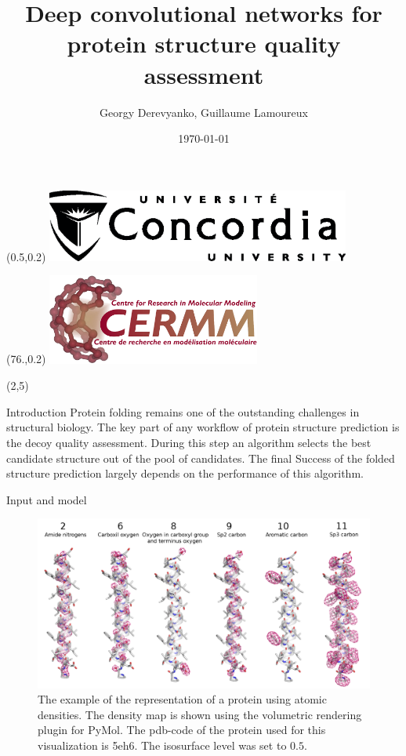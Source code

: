 \documentclass[final, unknownkeysallowed]{beamer}
\title{Deep convolutional networks for protein structure quality assessment}
\author{Georgy Derevyanko, Guillaume Lamoureux}
\institute[CLS]{Concordia University, QC, Canada}
\date{\today}
\begin{document}
\begin{frame}{}

\begin{textblock}{6}(0.5,0.2)
\includegraphics[width=10.0cm]{Logo/ConULogo_K}
\end{textblock}
\begin{textblock}{6}(76.,0.2)
\includegraphics[width=7.0cm]{Logo/CERMM_transparent.png}
\end{textblock}



\begin{textblock}{39.0}(2,5)
\begin{block}{Introduction}
Protein folding remains one of the outstanding challenges in structural biology. 
The key part of any workflow of protein structure prediction is the decoy quality assessment. 
During this step an algorithm selects the best candidate structure out of the pool of candidates. The final 
Success of the folded structure prediction largely depends on the performance of this algorithm.
\end{block}

\begin{block}{Input and model}

\begin{figure}[H]
    \centering
    \includegraphics[width=\linewidth]{../draft/Fig/atomic_densities_V3.png}
    \caption{The example of the representation of a protein using atomic densities. The density map is 
    shown using the volumetric rendering plugin for PyMol. The pdb-code of the protein used for this visualization is 5eh6.
    The isosurface level was set to $0.5$.}
    \label{Fig:atomic_densities}
\end{figure}


\end{block}
\end{textblock}
\end{frame}
\end{document}
